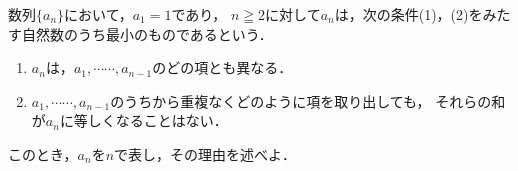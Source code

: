 \documentclass[../../main.tex]{subfiles}
\begin{document}
数列$\{ a_n \}$において，$a_1=1$であり，
$n\geqq2$に対して$a_n$は，次の条件(1)，(2)をみたす自然数のうち最小のものであるという．
\begin{enumerate}
  \item $a_n$は，$a_1,\cdots\cdots,a_{n-1}$のどの項とも異なる．
  \item $a_1,\cdots\cdots,a_{n-1}$のうちから重複なくどのように項を取り出しても，
    それらの和が$a_n$に等しくなることはない．
\end{enumerate}
このとき，$a_n$を$n$で表し，その理由を述べよ．
\end{document}
